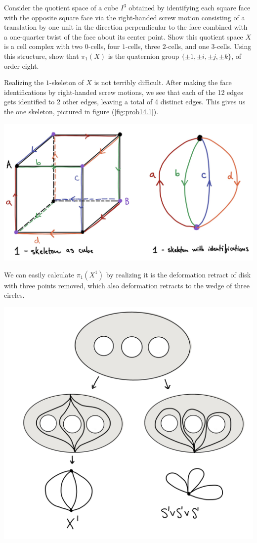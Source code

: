 \begin{homework}[e]
  \newpage
   Consider the quotient space of a cube $I^3$ obtained by identifying each square face with the opposite square face via the right-handed screw motion consisting of a translation by one unit in the direction perpendicular to the face combined with a one-quarter twist of the face about its center point. Show this quotient space $X$ is a cell complex with two $0$-cells, four $1$-cells, three $2$-cells, and one $3$-cells. Using this structure, show that $\pi_1(X)$ is the quaternion group $\{\pm 1, \pm i, \pm j,\pm k\}$, of order eight.
  \begin{prf}
    Realizing the $1$-skeleton of $X$ is not terribly difficult. After making the face identifications by right-handed screw motions, we see that each of the 12 edges gets identified to 2 other edges, leaving a total of 4 distinct edges. This gives us the one skeleton, pictured in figure (\ref{fig:prob14.1}). 
    \begin{center}
      \includegraphics[width=14cm]{figures/hwk4-fig4.jpg}
      \label{fig:prob14.1}
    \end{center}
    We can easily calculate $\pi_1(X^1)$ by realizing it is the deformation retract of disk with three points removed, which also deformation retracts to the wedge of three circles.
    \begin{center}
      \includegraphics[width=14cm]{figures/hwk4-fig5.jpg}

\end{center}
\end{prf}
\end{homework}
